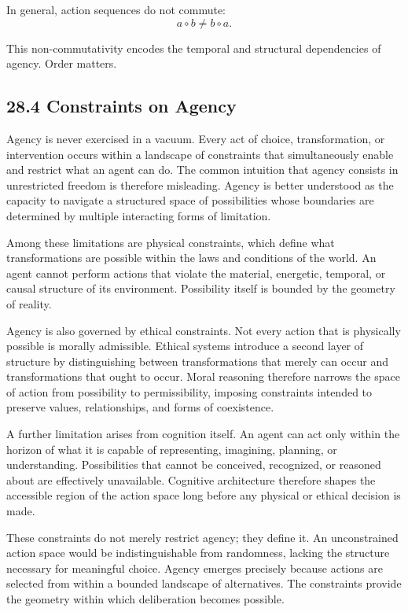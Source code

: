 \documentclass[12pt,letterpaper]{article}
\theoremstyle{remark}
\begin{document}
In general, action sequences do not commute:
\[
a \circ b \neq b \circ a.
\]

This non-commutativity encodes the temporal and structural dependencies of agency. Order matters.

\subsection{28.4 Constraints on Agency}

Agency is never exercised in a vacuum. Every act of choice, transformation, or intervention occurs within a landscape of constraints that simultaneously enable and restrict what an agent can do. The common intuition that agency consists in unrestricted freedom is therefore misleading. Agency is better understood as the capacity to navigate a structured space of possibilities whose boundaries are determined by multiple interacting forms of limitation.

Among these limitations are physical constraints, which define what transformations are possible within the laws and conditions of the world. An agent cannot perform actions that violate the material, energetic, temporal, or causal structure of its environment. Possibility itself is bounded by the geometry of reality.

Agency is also governed by ethical constraints. Not every action that is physically possible is morally admissible. Ethical systems introduce a second layer of structure by distinguishing between transformations that merely can occur and transformations that ought to occur. Moral reasoning therefore narrows the space of action from possibility to permissibility, imposing constraints intended to preserve values, relationships, and forms of coexistence.

A further limitation arises from cognition itself. An agent can act only within the horizon of what it is capable of representing, imagining, planning, or understanding. Possibilities that cannot be conceived, recognized, or reasoned about are effectively unavailable. Cognitive architecture therefore shapes the accessible region of the action space long before any physical or ethical decision is made.

These constraints do not merely restrict agency; they define it. An unconstrained action space would be indistinguishable from randomness, lacking the structure necessary for meaningful choice. Agency emerges precisely because actions are selected from within a bounded landscape of alternatives. The constraints provide the geometry within which deliberation becomes possible.
\end{document}
